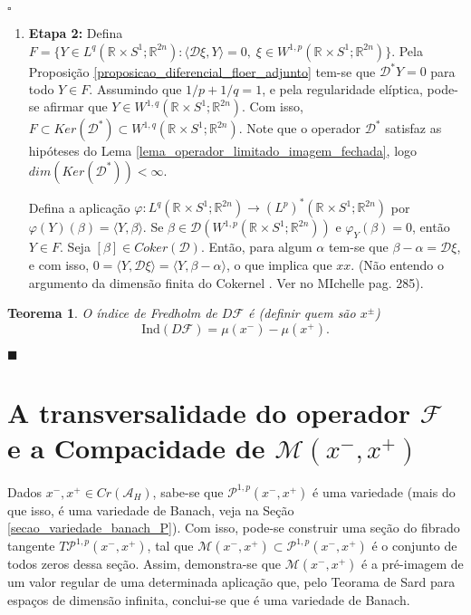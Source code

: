 \documentclass[12pt]{book}
\newtheorem{teorema}{Teorema}[section]
\newenvironment{prova}[1]{$\square$ #1}{\hfill$\blacksquare$}
\newcommand{\caminhosexponenciaisconectantes}[2]{\mathcal{P}^{1,p}(#1, #2)}
\newcommand{\caminhosexponenciaisconectantespadrao}{\caminhosexponenciaisconectantes{x^{-}}{x^{+}}}
\newcommand{\circulo}{S^{1}}
\newcommand{\classe}[1]{[#1]}
\newcommand{\diferencialfloer}{D\operadorFloer}
\newcommand{\diferencialfloerabrev}{\mathcal{D}}
\newcommand{\energiafinitaM}{\mathcal{M}}
\newcommand{\energiafinitaMconectante}{\energiafinitaM(x^{-}, x^{+})}
\newcommand{\espacoLpadjuntoretacirculo}{L^{q}(\retacartesianocirculo;\real{2n})}
\newcommand{\espacoLpdual}{(L^{p})^{*}(\retacartesianocirculo;\real{2n})}
\newcommand{\espacosobolevcontradominio}[2]{W^{1,p}(#1;#2)}
\newcommand{\espacosobolevadjuntoretacirculo}{W^{1,q}(\retacartesianocirculo;\real{2n})}
\newcommand{\espacosobolevretacirculo}{\espacosobolevcontradominio{\retacartesianocirculo}{\real{2n}}}
\newcommand{\funcionalH}{\mathcal{A}_{H}}
\newcommand{\ind}{\text{Ind}}
\newcommand{\operadorFloer}{\mathcal{F}}
\newcommand{\pontoscriticos}[1]{\textit{Cr}(#1)}
\newcommand{\produtointerno}[2]{\langle #1, #2 \rangle}
\newcommand{\retacartesianocirculo}{\real{} \times \circulo}
\newcommand{\real}[1]{\mathbb{R}^{#1}}
\newcommand{\alerta}[1]{{\color{red}#1}}
\begin{document}
\begin{prova}
\begin{enumerate}
			\item \textbf{Etapa 2:} Defina 
			$
			F = \{ Y \in \espacoLpadjuntoretacirculo: \produtointerno{\diferencialfloerabrev\xi}{Y}=0,\; \xi \in \espacosobolevretacirculo\}.
			$ Pela Proposição \ref{proposicao_diferencial_floer_adjunto}  tem-se que $\diferencialfloerabrev^{*}Y=0$ para todo $Y \in F$. Assumindo que $1/p+1/q=1$, e pela regularidade elíptica, pode-se afirmar que $Y \in \espacosobolevadjuntoretacirculo$. Com isso, $F\subset Ker(\diferencialfloerabrev^{*}) \subset \espacosobolevadjuntoretacirculo$. Note que o operador $\diferencialfloerabrev^{*}$ satisfaz as hipóteses do Lema \ref{lema_operador_limitado_imagem_fechada}, logo $dim(Ker(\diferencialfloerabrev^{*}))<\infty$.
			
			Defina a aplicação $\varphi:\espacoLpadjuntoretacirculo \to \espacoLpdual$ por $\varphi(Y)(\beta)=\produtointerno{Y}{\beta}$. Se $\beta \in \diferencialfloerabrev(\espacosobolevretacirculo)$ e $\varphi_{Y}(\beta) = 0$, então $Y \in F$. Seja $\classe{\beta} \in Coker(\diferencialfloerabrev)$. Então, para algum $\alpha$ tem-se que $\beta-\alpha=\diferencialfloerabrev\xi$, e com isso, $0= \produtointerno{Y}{\diferencialfloerabrev\xi}=\produtointerno{Y}{\beta-\alpha}$, o que implica que $xx$. \alerta{(Não entendo o argumento da dimensão finita do Cokernel . Ver no MIchelle pag. 285).}
		\end{enumerate}
		
		\begin{teorema}\label{teorema_indice_diferencial_operador_floer}
			O índice de Fredholm de $\diferencialfloer$ é \alerta{(definir quem são $x^{\pm}$)}
			$$
			\ind(\diferencialfloer) = \mu(x^{-}) - \mu(x^{+}).
			$$
		\end{teorema}
	
	\end{prova}
	
	\section{A transversalidade do operador $\operadorFloer$ e a Compacidade de $\energiafinitaMconectante$}\label{secao_transversalidade_compacidade_M}

	Dados $x^{-}, x^{+}\in \pontoscriticos{\funcionalH}$, sabe-se que $\caminhosexponenciaisconectantespadrao$ é uma variedade (mais do que isso, é uma variedade de Banach, veja na Seção \ref{secao_variedade_banach_P}). Com isso, pode-se construir uma seção do fibrado tangente $T\caminhosexponenciaisconectantespadrao$, tal que $\energiafinitaMconectante\subset \caminhosexponenciaisconectantespadrao$ é o conjunto de todos zeros dessa seção. Assim, demonstra-se que $\energiafinitaMconectante$ é a pré-imagem de um valor regular de uma determinada aplicação que, pelo Teorama de Sard para espaços de dimensão infinita, conclui-se que é uma variedade de Banach.
	
\end{document}
